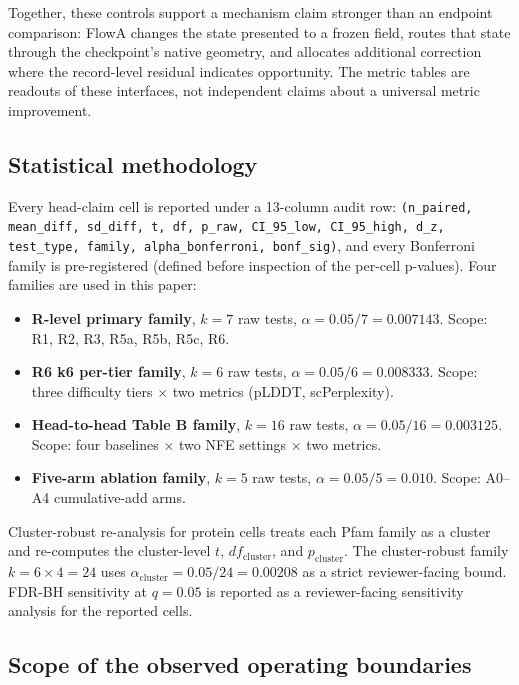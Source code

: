 \documentclass[journal,twocolumn,final]{IEEEtran}
\begin{document}
Together, these controls support a mechanism claim stronger than an endpoint comparison: FlowA changes the state presented to a frozen field, routes that state through the checkpoint's native geometry, and allocates additional correction where the record-level residual indicates opportunity. The metric tables are readouts of these interfaces, not independent claims about a universal metric improvement.

\subsection{Statistical methodology}

Every head-claim cell is reported under a 13-column audit row: \texttt{(n\_paired, mean\_diff, sd\_diff, t, df, p\_raw, CI\_95\_low, CI\_95\_high, d\_z, test\_type, family, alpha\_bonferroni, bonf\_sig)}, and every Bonferroni family is pre-registered (defined before inspection of the per-cell p-values). Four families are used in this paper:

\begin{itemize}
\setlength{\itemsep}{2pt}
\item \textbf{R-level primary family}, $k = 7$ raw tests, $\alpha = 0.05/7 = 0.007143$. Scope: R1, R2, R3, R5a, R5b, R5c, R6.
\item \textbf{R6 k6 per-tier family}, $k = 6$ raw tests, $\alpha = 0.05/6 = 0.008333$. Scope: three difficulty tiers \ensuremath{\times} two metrics (pLDDT, scPerplexity).
\item \textbf{Head-to-head Table B family}, $k = 16$ raw tests, $\alpha = 0.05/16 = 0.003125$. Scope: four baselines \ensuremath{\times} two NFE settings \ensuremath{\times} two metrics.
\item \textbf{Five-arm ablation family}, $k = 5$ raw tests, $\alpha = 0.05/5 = 0.010$. Scope: A0--A4 cumulative-add arms.
\end{itemize}

Cluster-robust re-analysis for protein cells treats each Pfam family as a cluster and re-computes the cluster-level $t$, $df_\text{cluster}$, and $p_\text{cluster}$. The cluster-robust family $k = 6 \times 4 = 24$ uses $\alpha_\text{cluster} = 0.05/24 = 0.00208$ as a strict reviewer-facing bound. FDR-BH sensitivity at $q = 0.05$ is reported as a reviewer-facing sensitivity analysis for the reported cells.

\subsection{Scope of the observed operating boundaries}
\label{sec:scope}
\end{document}
